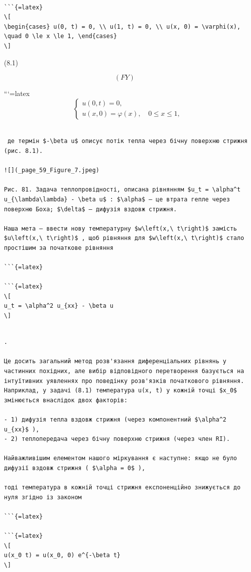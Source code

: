 \documentclass[
]{article}
\begin{document}
\begin{verbatim}

```{=latex}
\[
\begin{cases} u(0, t) = 0, \\ u(1, t) = 0, \\ u(x, 0) = \varphi(x), \quad 0 \le x \le 1, \end{cases}
\]
\end{verbatim}

(8.1)

\[
(FY) \quad
\]

```{=latex}
\[
\begin{cases} u(0, t) = 0, \\ u(x, 0) = \varphi(x), \quad 0 \le x \le 1, \end{cases}
\]

\begin{verbatim}

 де термін $-\beta u$ описує потік тепла через бічну поверхню стрижня (рис. 8.1).

![](_page_59_Figure_7.jpeg)

Рис. 81. Задача теплопровідності, описана рівнянням $u_t = \alpha^t u_{\lambda\lambda} - \beta u$ : $\alpha$ — це втрата гепле через поверхню Боха; $\delta$ – дифузія вздовж стрижня.

Наша мета — ввести нову температурну $w\left(x,\ t\right)$ замість $u\left(x,\ t\right)$ , щоб рівняння для $w\left(x,\ t\right)$ стало простішим за початкове рівняння

```{=latex}

```{=latex}
\[
u_t = \alpha^2 u_{xx} - \beta u
\]
\end{verbatim}

\begin{verbatim}

.

Це досить загальний метод розв'язання диференціальних рівнянь у частинних похідних, але вибір відповідного перетворення базується на інтуїтивних уявленнях про поведінку розв'язків початкового рівняння. Наприклад, у задачі (8.1) температура u(x, t) у кожній точці $x_0$ змінюється внаслідок двох факторів:

- 1) дифузія тепла вздовж стрижня (через компонентний $\alpha^2 u_{xx}$ ),
- 2) теплопередача через бічну поверхню стрижня (через член RI).

Найважливішим елементом нашого міркування є наступне: якщо не було дифузії вздовж стрижня ( $\alpha = 0$ ),

тоді температура в кожній точці стрижня експоненційно знижується до нуля згідно із законом

```{=latex}

```{=latex}
\[
u(x_0 t) = u(x_0, 0) e^{-\beta t}
\]
\end{verbatim}
\end{document}
